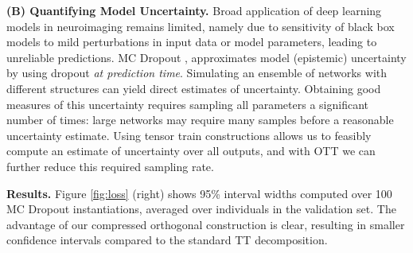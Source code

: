 \textbf{(B) Quantifying Model Uncertainty.}
Broad application of deep learning models in neuroimaging remains limited, namely due to sensitivity of black box models to mild perturbations in input data or model parameters, leading to unreliable predictions.
MC Dropout \cite{gal2016dropout}, approximates model (epistemic) uncertainty by using dropout \textit{at prediction time}. Simulating an ensemble of networks with different structures can yield direct estimates of uncertainty.
Obtaining good measures of this uncertainty requires sampling all parameters a significant number of times: large networks may require many samples before a reasonable uncertainty estimate.
Using tensor train constructions allows us to feasibly compute an estimate of uncertainty over all outputs, and with OTT we can further reduce this required sampling rate.

{\bf Results.} Figure \ref{fig:loss} (right)
shows
95\% interval widths computed over 100 MC Dropout instantiations, averaged over individuals in the validation set. The advantage of our compressed orthogonal construction is clear, resulting in smaller confidence intervals compared to the standard TT decomposition. 




